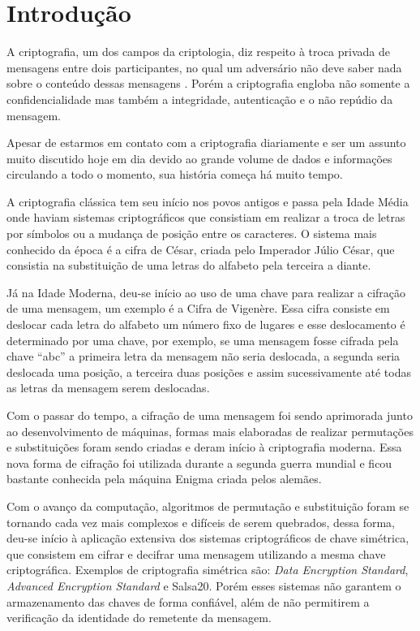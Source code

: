 \chapter[Introdução]{Introdução}

A criptografia, um dos campos da criptologia, diz respeito à troca privada de mensagens entre dois participantes, no qual um adversário não deve saber nada sobre o conteúdo dessas mensagens \cite{cryptRivest}. Porém a criptografia engloba não somente a confidencialidade mas também a integridade, autenticação e o não repúdio da mensagem.

Apesar de estarmos em contato com a criptografia diariamente e ser um assunto muito discutido hoje em dia devido ao grande volume de dados e informações circulando a todo o momento, sua história começa há muito tempo. 

A criptografia clássica tem seu início nos povos antigos e passa pela Idade Média onde haviam sistemas criptográficos que consistiam em realizar a troca de letras por símbolos ou a mudança de posição entre os caracteres. O sistema mais conhecido da época é a cifra de César, criada pelo Imperador Júlio César, que consistia na substituição de uma letras do alfabeto pela terceira a diante. 

Já na Idade Moderna, deu-se início ao uso de uma chave para realizar a cifração de uma mensagem, um exemplo é a Cifra de Vigenère. Essa cifra consiste em deslocar cada letra do alfabeto um número fixo de lugares e esse deslocamento é determinado por uma chave, por exemplo, se uma mensagem fosse cifrada pela chave ``abc'' a primeira letra da mensagem não seria deslocada, a segunda seria deslocada uma posição, a terceira duas posições e assim sucessivamente até todas as letras da mensagem serem deslocadas. 

Com o passar do tempo, a cifração de uma mensagem foi sendo aprimorada junto ao desenvolvimento de máquinas, formas mais elaboradas de realizar permutações e substituições foram sendo criadas e deram início à criptografia moderna. Essa nova forma de cifração foi utilizada durante a segunda guerra mundial e ficou bastante conhecida pela máquina Enigma criada pelos alemães. 

Com o avanço da computação, algoritmos de permutação e substituição foram se tornando cada vez mais complexos e difíceis de serem quebrados, dessa forma, deu-se início à aplicação extensiva dos sistemas criptográficos de chave simétrica, que consistem em cifrar e decifrar uma mensagem utilizando a mesma chave criptográfica. Exemplos de criptografia simétrica são: \textit{Data Encryption Standard}, \textit{Advanced Encryption Standard} e Salsa20. Porém esses sistemas não garantem o armazenamento das chaves de forma confiável, além de não permitirem a verificação da identidade do remetente da mensagem.

